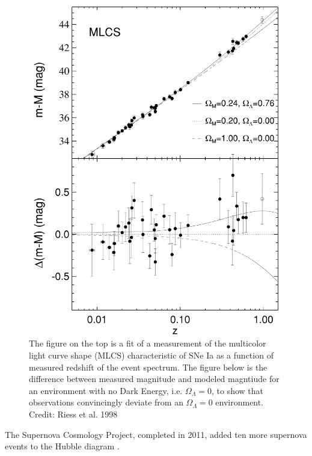 \documentclass{paper}
\begin{document}
  \begin{figure}[!htb]
    \begin{centering}
    \includegraphics[scale=0.4]{DE-sn_lightcurve.pdf}
    \caption{The figure on the top is a fit of a measurement of the multicolor 
      light curve shape (MLCS) characteristic of SNe Ia as a function of 
      measured redshift of the event spectrum. The figure below is the
      difference between measured magnitude and modeled magntiude for an 
      environment with no Dark Energy, i.e. \(\Omega_{\Lambda} = 0\), to show
      that observations convincingly deviate from an \(\Omega_{\Lambda} = 0\) 
      environment.
    Credit: Riess et al. 1998}
    \label{fig:DE-sn_lightcurve}
    \end{centering}
  \end{figure}

  The Supernova Cosmology Project, completed in 2011, added ten more supernova 
  events to the Hubble diagram \cite{2012ApJ...746...85S}.
\end{document}
